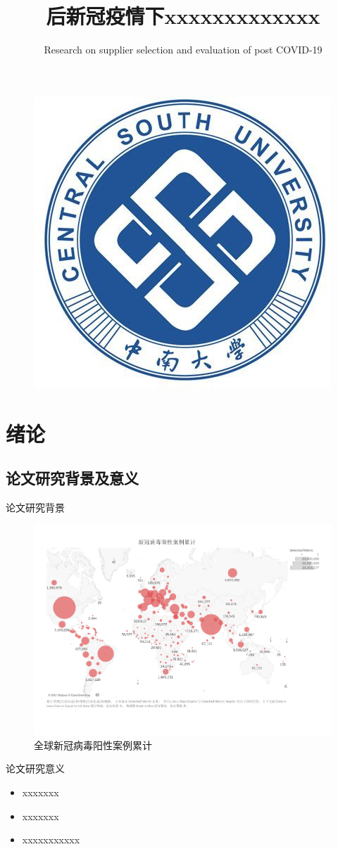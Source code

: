 \documentclass{beamer}
\title{后新冠疫情下xxxxxxxxxxxxx}
\subtitle{Research on supplier selection and evaluation of post COVID-19}
\author[略略略]{(本科毕业设计论文答辩报告)\vskip 20pt学~~~~~~生：略~略~略~~~~~~~\vskip 5pt 指导教师：略~略~略~教授}
\institute[中南大学~交通运输工程学院]{\small \vskip 38pt交通运输工程学院}
\date{\small \vskip -17pt二〇二一年六月}
\begin{document}
\songti
\begin{frame}
	\vspace{-15mm}
    \titlepage
\vspace{-43mm}
 \begin{figure}[htpb]
	\begin{center}
		\includegraphics[width=0.16\linewidth]{pic/csulogo.jpg}
	\end{center}
\end{figure}
\end{frame}
\begin{frame}
    \tableofcontents[sectionstyle=show,subsectionstyle=show/shaded/hide,subsubsectionstyle=show/shaded/hide]
\end{frame}


\section{绪论}
\subsection{论文研究背景及意义}
\begin{frame}{论文研究背景}
		\begin{figure}[h]
			\centering
			\includegraphics[height=0.7\textheight,trim=50 130 130 100,clip]{pic/Coronavirus_(COVID-19)_Cases.pdf}
			\caption{全球新冠病毒阳性案例累计}
		\end{figure}


\end{frame}
\begin{frame}{论文研究意义}
	\begin{itemize}
		\item xxxxxxx
		\item xxxxxxx
		\item xxxxxxxxxxx
	\end{itemize}

\end{frame}
\end{document}
